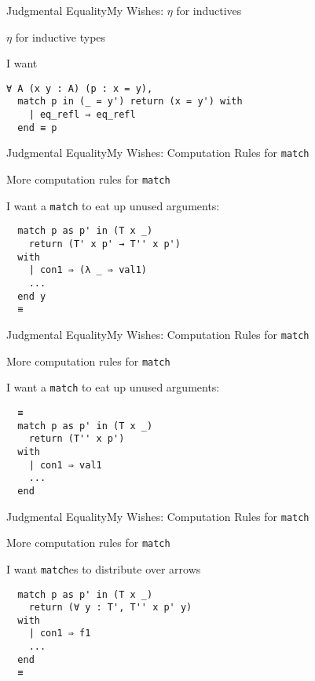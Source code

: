 \documentclass{beamer}
\begin{document}
\begin{frame}[fragile]{Judgmental Equality}{My Wishes: \texorpdfstring{$\eta$}{η} for inductives}
  \Large
  \begin{center}
    $\eta$ for inductive types
  \end{center}
  I want
\begin{verbatim}
∀ A (x y : A) (p : x = y),
  match p in (_ = y') return (x = y') with
    | eq_refl ⇒ eq_refl
  end ≡ p

\end{verbatim}
\end{frame}

\begin{frame}[fragile]{Judgmental Equality}{My Wishes: Computation Rules for \texorpdfstring{\texttt{match}}{match}}
  \Large
  \begin{center}
    More computation rules for \texttt{match}
  \end{center}
  I want a \texttt{match} to eat up unused arguments:
\begin{verbatim}
  match p as p' in (T x _)
    return (T' x p' → T'' x p')
  with
    | con1 ⇒ (λ _ ⇒ val1)
    ...
  end y
  ≡
\end{verbatim}
\end{frame}

\begin{frame}[fragile]{Judgmental Equality}{My Wishes: Computation Rules for \texorpdfstring{\texttt{match}}{match}}
  \Large
  \begin{center}
    More computation rules for \texttt{match}
  \end{center}
  I want a \texttt{match} to eat up unused arguments:
\begin{verbatim}
  ≡
  match p as p' in (T x _)
    return (T'' x p')
  with
    | con1 ⇒ val1
    ...
  end
\end{verbatim}
\end{frame}

\begin{frame}[fragile]{Judgmental Equality}{My Wishes: Computation Rules for \texorpdfstring{\texttt{match}}{match}}
  \Large
  \begin{center}
    More computation rules for \texttt{match}
  \end{center}
  I want \texttt{match}es to distribute over arrows
\begin{verbatim}
  match p as p' in (T x _)
    return (∀ y : T', T'' x p' y)
  with
    | con1 ⇒ f1
    ...
  end
  ≡
\end{verbatim}
\end{frame}
\end{document}

